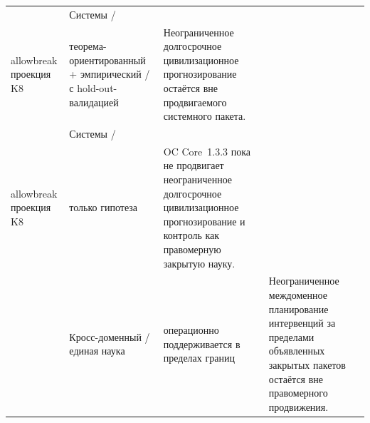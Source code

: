 \begin{longtable}{@{}L{0.15\textwidth}L{0.12\textwidth}L{0.13\textwidth}L{0.50\textwidth}@{}}
 & Системы /\\allowbreak проекция K8 & теорема-ориентированный + эмпирический / с hold-out-валидацией & Неограниченное долгосрочное цивилизационное прогнозирование остаётся вне продвигаемого системного пакета. \\
 & Системы /\\allowbreak проекция K8 & только гипотеза & OC Core~1.3.3 пока не продвигает неограниченное долгосрочное цивилизационное прогнозирование и контроль как правомерную закрытую науку. \\
 & Кросс-доменный /\allowbreak единая наука & операционно поддерживается в пределах границ & Неограниченное междоменное планирование интервенций за пределами объявленных закрытых пакетов остаётся вне правомерного продвижения. \\
\bottomrule
\end{longtable}

